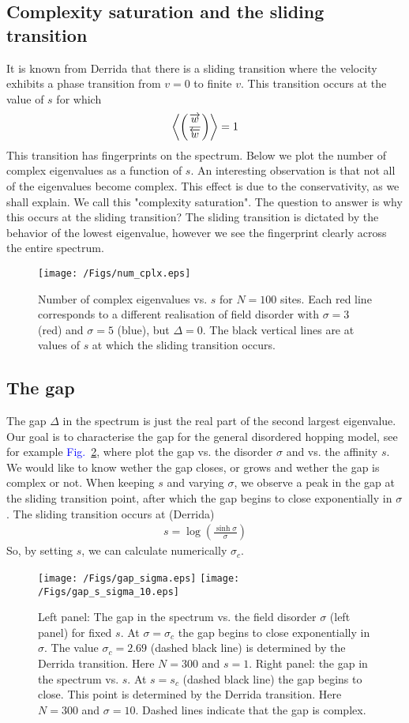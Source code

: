 \documentclass[aps,pre,floats,floatfix,fleqn,notitlepage]{revtex4-1}
\newcommand{\beq}{\begin{eqnarray}}
\newcommand{\eeq}{\end{eqnarray}}
\newcommand{\Fig}[1] {\textcolor{blue}{Fig.~\ref{#1}}} %
\newcommand{\ola}{\protect\overleftarrow}
\newcommand{\ora}{\protect\overrightarrow}
\begin{document}
\subsection{Complexity saturation and the sliding transition }
It is known from Derrida that there is a sliding transition where the velocity exhibits a phase transition from 
$v=0$ to finite $v$. This transition occurs at the value of $s$ for which
%
\beq
\left\langle \left( \frac{\ora{w}}{\ola{w}}\right) \right\rangle = 1
\eeq
%
This transition has fingerprints on the spectrum.  Below we plot the number of complex eigenvalues 
as a function of $s$. 
An interesting observation is that not all of the eigenvalues become complex. 
This effect is due to the conservativity, as we shall explain.
We call this "complexity saturation".
The question to answer is why this occurs at the sliding transition?
The sliding transition is dictated by the behavior of the lowest eigenvalue, however we see the fingerprint clearly across the entire spectrum.
\begin{figure}[h]
\texttt{[image: /Figs/num\_cplx.eps]}

\caption{Number of complex eigenvalues vs. $s$ for $N=100$ sites. Each red line corresponds to a different 
realisation of field disorder with $\sigma=3$(red) and $\sigma=5$ (blue), but $\Delta=0$. The black vertical lines are at values of $s$ at which the sliding transition occurs.}
\label{fig5}
\end{figure}


\subsection{The gap}
The gap $\Delta$ in the spectrum is just the real part of the second largest eigenvalue.
Our goal is to characterise the gap for the general disordered hopping model, see for example \Fig{fig11}, where plot the gap vs. the disorder $\sigma$ and vs. the affinity $s$. 
We would like to know wether the gap closes, or grows and wether the gap is complex or not. 
When keeping $s$ and varying $\sigma$, we observe a peak in the gap at the sliding transition point, after which the gap begins to close exponentially in $\sigma$. 
%
The sliding transition occurs at (Derrida)
%
\beq
s= \log\left( \frac{\sinh \sigma}{\sigma}\right)
\eeq
%
So, by setting $s$, we can calculate numerically $\sigma_c$.
\begin{figure}[h]
\texttt{[image: /Figs/gap\_sigma.eps]}
\texttt{[image: /Figs/gap\_s\_sigma\_10.eps]}
\caption{
Left panel: The gap in the spectrum vs. the field disorder $\sigma$ (left panel) for fixed $s$. 
At $\sigma=\sigma_c$ the gap begins to close exponentially in $\sigma$. The value $\sigma_c=2.69$ (dashed black line) is determined by the Derrida transition. Here $N=300$ and $s=1$.
Right panel: the gap in the spectrum vs. $s$.
At $s=s_c$ (dashed black line)  the gap begins to close. This point is determined by the Derrida transition. Here $N=300$ and $\sigma=10$. Dashed lines indicate that the gap is complex.}
\label{fig11}
\end{figure}
\end{document}
